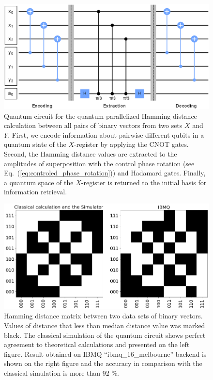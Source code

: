 \documentclass[pra,showkeys,twocolumn,showpacs]{revtex4-1}
\begin{document}
\begin{figure}[t]
	\includegraphics[width=\columnwidth]{qcircuit.eps}
    \caption{
		Quantum circuit for the quantum parallelized Hamming distance calculation between all pairs of binary vectors from two sets ${X}$ and ${Y}$.
		First, we encode information about pairwise different qubits in a quantum state of the $X$-register by applying the CNOT gates.
		Second, the Hamming distance values are extracted to the amplitudes of superposition with the control phase rotation (see Eq.~(\ref{eq:controled_phase_rotation})) and Hadamard gates.
		Finally, a quantum space of the $X$-register is returned to the initial basis for information retrieval.
	}
	\label{fig:qcircuit}
\end{figure}



\begin{figure}[t]
	\includegraphics[width=0.95\columnwidth]{distance_matrix.png}
	\caption{
		Hamming distance matrix between two data sets of binary vectors.
		Values of distance that less than median distance value was marked black.
		The classical simulation of the quantum circuit shows perfect agreement to theoretical calculations and presented on the left figure.
		Result obtained on  IBMQ ``ibmq\_16\_melbourne'' backend is shown on the right figure and the accuracy in comparison with the classical simulation is more than 92 $\%$.
	}
	\label{fig:distance_matrix}
\end{figure}
\end{document}
